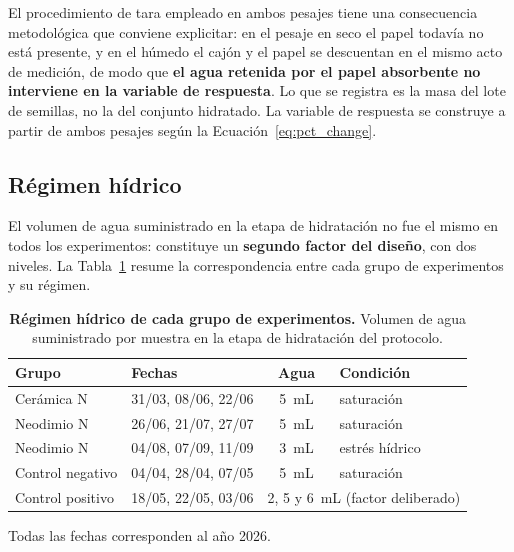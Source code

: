 El procedimiento de tara empleado en ambos pesajes tiene una consecuencia metodológica que conviene explicitar: en el pesaje en seco el papel todavía no está presente, y en el húmedo el cajón y el papel se descuentan en el mismo acto de medición, de modo que \textbf{el agua retenida por el papel absorbente no interviene en la variable de respuesta}. Lo que se registra es la masa del lote de semillas, no la del conjunto hidratado. La variable de respuesta se construye a partir de ambos pesajes según la Ecuación~\ref{eq:pct_change}.

\subsection{Régimen hídrico}
\label{subsec:regimen_hidrico}

El volumen de agua suministrado en la etapa de hidratación no fue el mismo en todos los experimentos: constituye un \textbf{segundo factor del diseño}, con dos niveles. La Tabla~\ref{tab:regimen_hidrico} resume la correspondencia entre cada grupo de experimentos y su régimen.

\begin{table}[tbp]
\small
\setlength{\tabcolsep}{3pt}
\centering
\begin{threeparttable}
\caption[Régimen hídrico de cada grupo de experimentos]{\textbf{Régimen hídrico de cada grupo de experimentos.} Volumen de agua suministrado por muestra en la etapa de hidratación del protocolo.}
\label{tab:regimen_hidrico}
\begin{tabular}{@{}llcl@{}}
\toprule
Grupo & Fechas & Agua & Condición \\
\midrule
Cerámica N        & 31/03, 08/06, 22/06 & 5~mL & saturación \\
Neodimio N        & 26/06, 21/07, 27/07 & 5~mL & saturación \\
Neodimio N        & 04/08, 07/09, 11/09 & 3~mL & estrés hídrico \\
Control negativo  & 04/04, 28/04, 07/05 & 5~mL & saturación \\
Control positivo  & 18/05, 22/05, 03/06 & \multicolumn{2}{l}{2, 5 y 6~mL (factor deliberado)} \\
\bottomrule
\end{tabular}
\begin{tablenotes}[flushleft]\footnotesize
  \item Todas las fechas corresponden al año 2026.
\end{tablenotes}
\end{threeparttable}
\end{table}

